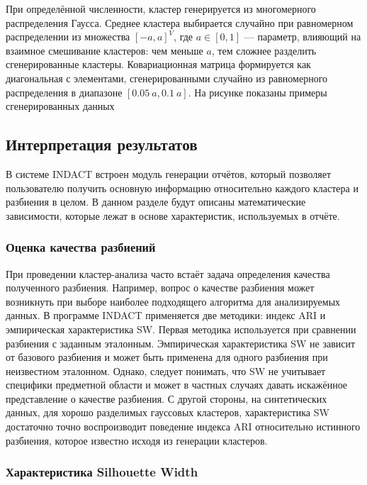 \documentclass[12pt]{diploma}
\begin{document}
	При определённой численности, кластер генерируется из многомерного распределения Гаусса. Среднее кластера выбирается случайно при равномерном распределении из множества $ [-a,a]^V $, где $ a \in [0,1] $ --- параметр, влияющий на взаимное смешивание кластеров: чем меньше $ a $, тем сложнее разделить сгенерированные кластеры. Ковариационная матрица формируется как диагональная с элементами, сгенерированными случайно из равномерного распределения в диапазоне $ [0.05\:a, 0.1\:a] $. 
	На рисунке показаны примеры сгенерированных данных 
	
	
	\subsection{Интерпретация результатов}
	
	В системе INDACT встроен модуль генерации отчётов, который позволяет пользователю получить основную информацию относительно каждого кластера и разбиения в целом. В данном разделе будут описаны математические зависимости, которые лежат в основе характеристик, используемых в отчёте. 
	
		
	\subsubsection{Оценка качества разбиений}
	
	При проведении кластер-анализа часто встаёт задача определения качества полученного разбиения. Например, вопрос о качестве разбиения может возникнуть при выборе наиболее подходящего алгоритма для анализируемых данных. В программе INDACT применяется две методики: индекс ARI и эмпирическая характеристика SW. Первая методика используется при сравнении разбиения с заданным эталонным. Эмпирическая характеристика SW не зависит от базового разбиения и может быть применена для одного разбиения при неизвестном эталонном. Однако, следует понимать, что SW не учитывает специфики предметной области и может в частных случаях давать искажённое представление о качестве разбиения. С другой стороны, на синтетических данных, для хорошо разделимых гауссовых кластеров, характеристика SW достаточно точно воспроизводит поведение индекса ARI относительно истинного разбиения, которое известно исходя из генерации кластеров.

	\subsubsection{Характеристика Silhouette Width}
\end{document}
